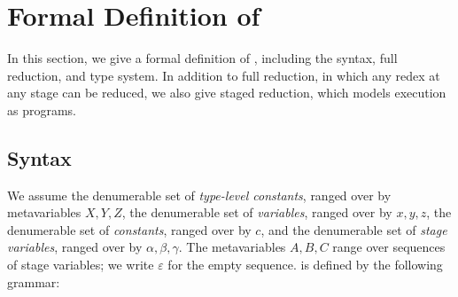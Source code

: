 
\section{Formal Definition of \LMD \label{sec:formal-definition}}

In this section, we give a formal definition of \LMD, including
the syntax, full reduction, and type system.  In addition to full reduction,
in which any redex at any stage can be reduced, we also give staged reduction,
which models execution as programs.

\subsection{Syntax}

We assume the denumerable set of \emph{type-level constants}, ranged over by
metavariables \(X, Y, Z\), the denumerable set of \emph{variables}, ranged
over by \(x,y,z\), the denumerable set of \emph{constants}, ranged over by
\(c\), and the denumerable set of \emph{stage variables}, ranged over by
\(\alpha, \beta, \gamma\).  The metavariables \(A, B, C\) range over
sequences of stage variables; we write \(\varepsilon\) for the empty
sequence. \LMD is defined by the following grammar:

